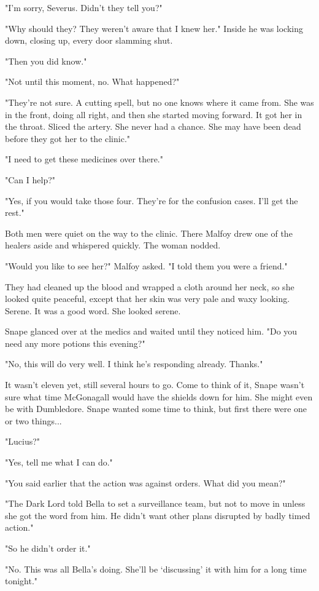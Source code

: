 "I'm sorry, Severus. Didn't they tell you?"

"Why should they? They weren't aware that I knew her." Inside he was locking down, closing up, every door slamming shut.

"Then you did know."

"Not until this moment, no. What happened?"

"They're not sure. A cutting spell, but no one knows where it came from. She was in the front, doing all right, and then she started moving forward. It got her in the throat. Sliced the artery. She never had a chance. She may have been dead before they got her to the clinic."

"I need to get these medicines over there."

"Can I help?"

"Yes, if you would take those four. They're for the confusion cases. I'll get the rest."

Both men were quiet on the way to the clinic. There Malfoy drew one of the healers aside and whispered quickly. The woman nodded.

"Would you like to see her?" Malfoy asked. "I told them you were a friend."

They had cleaned up the blood and wrapped a cloth around her neck, so she looked quite peaceful, except that her skin was very pale and waxy looking. Serene. It was a good word. She looked serene.

Snape glanced over at the medics and waited until they noticed him. "Do you need any more potions this evening?"

"No, this will do very well. I think he's responding already. Thanks."

It wasn't eleven yet, still several hours to go. Come to think of it, Snape wasn't sure what time McGonagall would have the shields down for him. She might even be with Dumbledore. Snape wanted some time to think, but first there were one or two things...

"Lucius?"

"Yes, tell me what I can do."

"You said earlier that the action was against orders. What did you mean?"

"The Dark Lord told Bella to set a surveillance team, but not to move in unless she got the word from him. He didn't want other plans disrupted by badly timed action."

"So he didn't order it."

"No. This was all Bella's doing. She'll be `discussing' it with him for a long time tonight."

